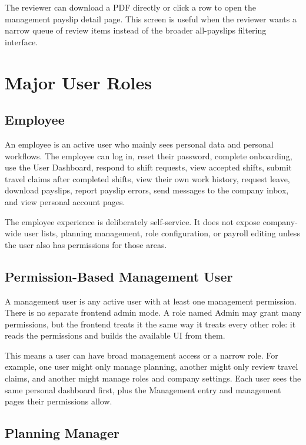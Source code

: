 \documentclass[11pt]{article}
\begin{document}
The reviewer can download a PDF directly or click a row to open the management payslip detail page. This screen is useful when the reviewer wants a narrow queue of review items instead of the broader all-payslips filtering interface.

\section{Major User Roles}

\subsection{Employee}

An employee is an active user who mainly sees personal data and personal workflows. The employee can log in, reset their password, complete onboarding, use the User Dashboard, respond to shift requests, view accepted shifts, submit travel claims after completed shifts, view their own work history, request leave, download payslips, report payslip errors, send messages to the company inbox, and view personal account pages.

The employee experience is deliberately self-service. It does not expose company-wide user lists, planning management, role configuration, or payroll editing unless the user also has permissions for those areas.

\subsection{Permission-Based Management User}

A management user is any active user with at least one management permission. There is no separate frontend admin mode. A role named Admin may grant many permissions, but the frontend treats it the same way it treats every other role: it reads the permissions and builds the available UI from them.

This means a user can have broad management access or a narrow role. For example, one user might only manage planning, another might only review travel claims, and another might manage roles and company settings. Each user sees the same personal dashboard first, plus the Management entry and management pages their permissions allow.

\subsection{Planning Manager}
\end{document}
